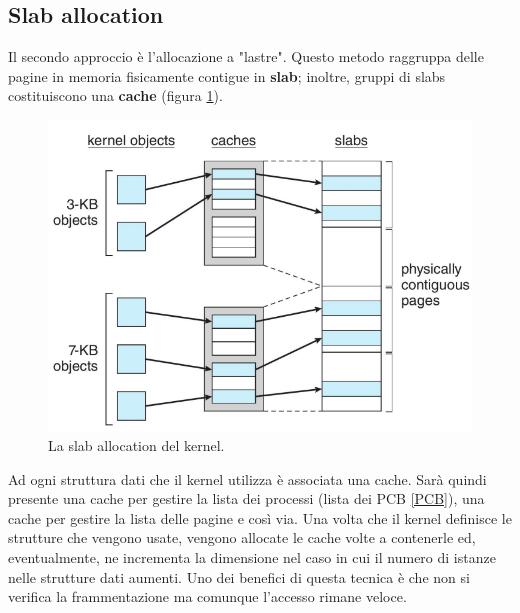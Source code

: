 \subsection{Slab allocation}
Il secondo approccio è l'allocazione a "lastre". Questo metodo raggruppa delle pagine in memoria fisicamente contigue in \textbf{slab}; inoltre, gruppi di slabs costituiscono una \textbf{cache} (figura \ref{fig:slab_allocation}).
\begin{figure}[h]
    \centering
    \includegraphics[width = .55\textwidth]{../res/imgs/virtual memory/slab_allocation.png}
    \caption{La slab allocation del kernel.}
    \label{fig:slab_allocation}
\end{figure}
Ad ogni struttura dati che il kernel utilizza è associata una cache. Sarà quindi presente una cache per gestire la lista dei processi (lista dei PCB \ref{PCB}), una cache per gestire la lista delle pagine e così via. Una volta che il kernel definisce le strutture che vengono usate, vengono allocate le cache volte a contenerle ed, eventualmente, ne incrementa la dimensione nel caso in cui il numero di istanze nelle strutture dati aumenti. Uno dei benefici di questa tecnica è che non si verifica la frammentazione ma comunque l'accesso rimane veloce.

